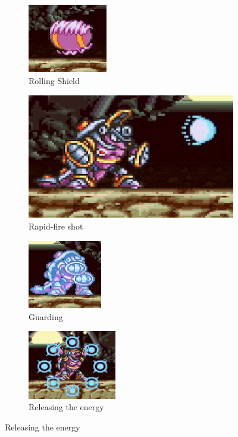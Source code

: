 \begin{figure}[htp]
	\centering
	\begin{subfigure}{0.45\textwidth}
		\centering
		\includegraphics[height=3cm]{figures/X1/Armored_armadillo/Armadillo_rolling.jpg}
		\caption{Rolling Shield}
	\end{subfigure}
	\begin{subfigure}{0.45\textwidth}
		\centering
		\includegraphics[width=\linewidth]{figures/X1/Armored_armadillo/Armadillo_cannon.jpg}
		\caption{Rapid-fire shot}
	\end{subfigure}	
	\begin{subfigure}{0.45\textwidth}
		\centering
		\includegraphics[height=3cm]{figures/X1/Armored_armadillo/Armadillo_energy_1.jpg}
		\caption{Guarding}
	\end{subfigure}
	\begin{subfigure}{0.45\textwidth}
		\centering
		\includegraphics[height=3cm]{figures/X1/Armored_armadillo/Armadillo_energy_2.jpg}
		\caption{Releasing the energy}
	\end{subfigure}
\end{figure}


